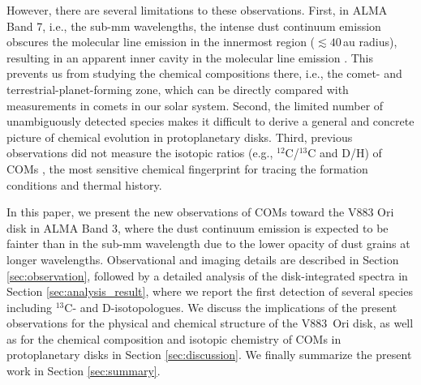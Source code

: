 \documentclass[twocolumn, twocolappendix, astrosymb, times]{aastex631}
\newcommand{\methanol}{CH$_3$OH\xspace}
\begin{document}
However, there are several limitations to these observations. First, in ALMA Band 7, i.e., the sub-mm wavelengths, the intense dust continuum emission obscures the molecular line emission in the innermost region ($\lesssim40$\,au radius), resulting in an apparent inner cavity in the molecular line emission \citep{vantHoff2018, Lee2019, Tobin2023}. This prevents us from studying the chemical compositions there, i.e., the comet- and terrestrial-planet-forming zone, which can be directly compared with measurements in comets in our solar system. Second, the limited number of unambiguously detected species \citep{Lee2019} makes it difficult to derive a general and concrete picture of chemical evolution in protoplanetary disks. Third, previous observations did not measure the isotopic ratios (e.g., $^{12}$C/$^{13}$C and D/H) of COMs \citep[except for the D/H ratio of \methanol;][]{Lee2019, Lee2023}, the most sensitive chemical fingerprint for tracing the formation conditions and thermal history.

In this paper, we present the new observations of COMs toward the V883 Ori disk in ALMA Band 3, where the dust continuum emission is expected to be fainter than in the sub-mm wavelength due to the lower opacity of dust grains at longer wavelengths. Observational and imaging details are described in Section \ref{sec:observation}, followed by a detailed analysis of the disk-integrated spectra in Section \ref{sec:analysis_result}, where we report the first detection of several species including $^{13}$C- and D-isotopologues. We discuss the implications of the present observations for the physical and chemical structure of the V883~Ori disk, as well as for the chemical composition and isotopic chemistry of COMs in protoplanetary disks in Section \ref{sec:discussion}. We finally summarize the present work in Section \ref{sec:summary}.

\end{document}
